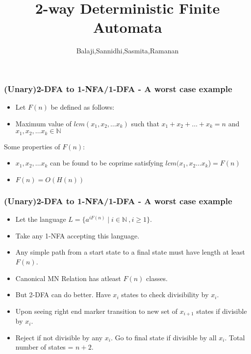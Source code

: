 \documentclass{beamer}
\title{2-way Deterministic Finite Automata}
\author{Balaji,Sannidhi,Sasmita,Ramanan}
\date{}
\institute{IISc Bangalore}
\newcommand{\nat}{\mathbb{N}}
\begin{document}
\maketitle



\begin{frame}
\frametitle{(Unary)2-DFA to 1-NFA/1-DFA - A worst case example}
\begin{itemize}
    \item Let $F(n)$ be defined as follows:
    \item Maximum value of $lcm(x_1,x_2,\ldots x_k)$ such that $x_1+x_2+\ldots+x_k=n$ and $x_1,x_2,\ldots x_k \in \nat$
\end{itemize}

    Some properties of $F(n)$:
    \begin{itemize}
        \item $x_1,x_2,\ldots x_k$ can be found to be coprime satisfying $lcm(x_1,x_2\ldots x_k$)$ = F(n)$
        \item $F(n) = O(H(n))$\\
    \end{itemize}
\end{frame}
\begin{frame}   
    \frametitle{(Unary)2-DFA to 1-NFA/1-DFA - A worst case example}
    \begin{itemize}
        \item Let the language $L = \{a^{iF(n)} \mid i \in \nat\ , i \ge 1\}$.
        \item Take any 1-NFA accepting this language.
        \item Any simple path from a start state to a final state must have length at least $F(n)$.
        \item Canonical MN Relation has atleast $F(n)$ classes.
        \item But 2-DFA can do better. Have $x_i$ states to check divisibility by $x_i$.
        \item Upon seeing right end marker transition to new set of $x_{i+1}$ states if divisible by $x_i$. 
        \item Reject if not divisible by any $x_i$. Go to final state if divisible by all $x_i$. Total number of states = $n+2$.
    \end{itemize}
\end{frame}
\end{document}
